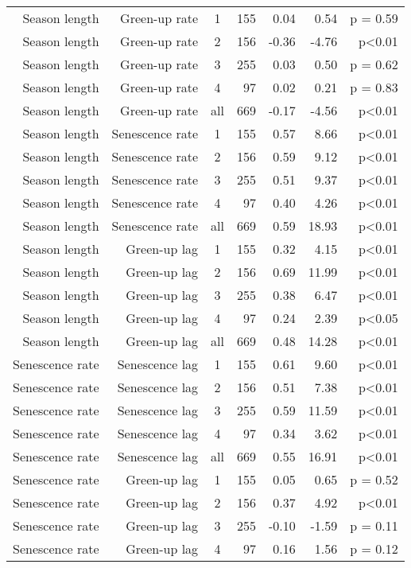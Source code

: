 \begin{table}[H]
\begin{tabular}{rrcrrrr}
   \hline
Season length & Green-up rate & 1 & 155 & 0.04 & 0.54 & p = 0.59 \\ 
  Season length & Green-up rate & 2 & 156 & -0.36 & -4.76 & p<0.01 \\ 
  Season length & Green-up rate & 3 & 255 & 0.03 & 0.50 & p = 0.62 \\ 
  Season length & Green-up rate & 4 &  97 & 0.02 & 0.21 & p = 0.83 \\ 
  Season length & Green-up rate & all & 669 & -0.17 & -4.56 & p<0.01 \\ 
   \hline
Season length & Senescence rate & 1 & 155 & 0.57 & 8.66 & p<0.01 \\ 
  Season length & Senescence rate & 2 & 156 & 0.59 & 9.12 & p<0.01 \\ 
  Season length & Senescence rate & 3 & 255 & 0.51 & 9.37 & p<0.01 \\ 
  Season length & Senescence rate & 4 &  97 & 0.40 & 4.26 & p<0.01 \\ 
  Season length & Senescence rate & all & 669 & 0.59 & 18.93 & p<0.01 \\ 
   \hline
Season length & Green-up lag & 1 & 155 & 0.32 & 4.15 & p<0.01 \\ 
  Season length & Green-up lag & 2 & 156 & 0.69 & 11.99 & p<0.01 \\ 
  Season length & Green-up lag & 3 & 255 & 0.38 & 6.47 & p<0.01 \\ 
  Season length & Green-up lag & 4 &  97 & 0.24 & 2.39 & p<0.05 \\ 
  Season length & Green-up lag & all & 669 & 0.48 & 14.28 & p<0.01 \\ 
   \hline
Senescence rate & Senescence lag & 1 & 155 & 0.61 & 9.60 & p<0.01 \\ 
  Senescence rate & Senescence lag & 2 & 156 & 0.51 & 7.38 & p<0.01 \\ 
  Senescence rate & Senescence lag & 3 & 255 & 0.59 & 11.59 & p<0.01 \\ 
  Senescence rate & Senescence lag & 4 &  97 & 0.34 & 3.62 & p<0.01 \\ 
  Senescence rate & Senescence lag & all & 669 & 0.55 & 16.91 & p<0.01 \\ 
   \hline
Senescence rate & Green-up lag & 1 & 155 & 0.05 & 0.65 & p = 0.52 \\ 
  Senescence rate & Green-up lag & 2 & 156 & 0.37 & 4.92 & p<0.01 \\ 
  Senescence rate & Green-up lag & 3 & 255 & -0.10 & -1.59 & p = 0.11 \\ 
  Senescence rate & Green-up lag & 4 &  97 & 0.16 & 1.56 & p = 0.12 \\ 

\end{tabular}
\end{table}
